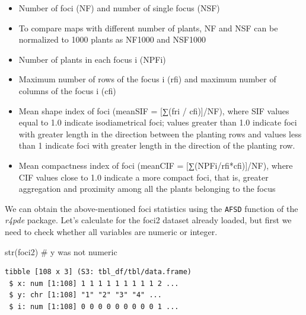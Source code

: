 \documentclass[
  letterpaper,
]{book}
\newenvironment{Shaded}{\begin{snugshade}}{\end{snugshade}}
\newcommand{\CommentTok}[1]{\textcolor[rgb]{0.37,0.37,0.37}{#1}}
\newcommand{\FunctionTok}[1]{\textcolor[rgb]{0.28,0.35,0.67}{#1}}
\newcommand{\NormalTok}[1]{\textcolor[rgb]{0.00,0.23,0.31}{#1}}
\newcommand{\OtherTok}[1]{\textcolor[rgb]{0.00,0.23,0.31}{#1}}
\newcommand{\SpecialCharTok}[1]{\textcolor[rgb]{0.37,0.37,0.37}{#1}}
\begin{document}
\begin{itemize}
\item
  Number of foci (NF) and number of single focus (NSF)
\item
  To compare maps with different number of plants, NF and NSF can be
  normalized to 1000 plants as NF1000 and NSF1000
\item
  Number of plants in each focus i (NPFi)
\item
  Maximum number of rows of the focus i (rfi) and maximum number of
  columns of the focus i (cfi)
\item
  Mean shape index of foci (meanSIF = {[}∑(fri / cfi){]}/NF), where SIF
  values equal to 1.0 indicate isodiametrical foci; values greater than
  1.0 indicate foci with greater length in the direction between the
  planting rows and values less than 1 indicate foci with greater length
  in the direction of the planting row.
\item
  Mean compactness index of foci (meanCIF = {[}∑(NPFi/rfi*cfi){]}/NF),
  where CIF values close to 1.0 indicate a more compact foci, that is,
  greater aggregation and proximity among all the plants belonging to
  the focus
\end{itemize}

We can obtain the above-mentioned foci statistics using the
\texttt{AFSD} function of the \emph{r4pde} package. Let's calculate for
the foci2 dataset already loaded, but first we need to check whether all
variables are numeric or integer.

\begin{Shaded}
\begin{Highlighting}[]
\FunctionTok{str}\NormalTok{(foci2) }\CommentTok{\# y was not numeric}
\end{Highlighting}
\end{Shaded}

\begin{verbatim}
tibble [108 x 3] (S3: tbl_df/tbl/data.frame)
 $ x: num [1:108] 1 1 1 1 1 1 1 1 1 2 ...
 $ y: chr [1:108] "1" "2" "3" "4" ...
 $ i: num [1:108] 0 0 0 0 0 0 0 0 0 1 ...
\end{verbatim}

\begin{Shaded}
\end{Shaded}
\end{document}
